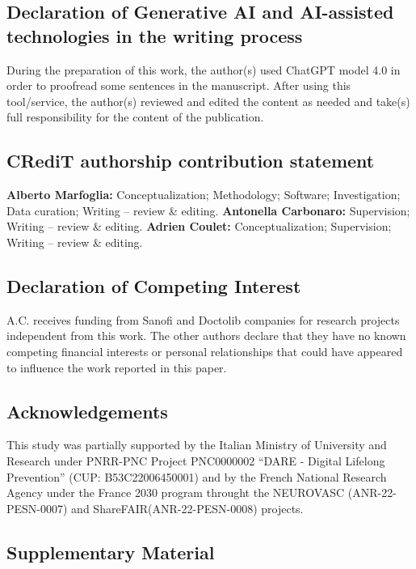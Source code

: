 \subsection*{Declaration of Generative AI and AI-assisted technologies in the writing process}
During the preparation of this work, the author(s) used ChatGPT model 4.0 in order to proofread some sentences in the manuscript. After using this tool/service, the author(s) reviewed and edited the content as needed and take(s) full responsibility for the content of the publication.

\subsection*{CRediT authorship contribution statement}

\textbf{Alberto Marfoglia:} Conceptualization; Methodology; Software; Investigation; Data curation; Writing – review \& editing.
\textbf{Antonella Carbonaro:} Supervision; Writing – review \& editing.
\textbf{Adrien Coulet:} Conceptualization; Supervision; Writing – review \& editing.


\subsection*{Declaration of Competing Interest}
A.C. receives funding from Sanofi and Doctolib companies for research projects independent from this work. The other authors declare that they have no known competing financial interests or personal relationships that could have appeared to influence the work reported in this paper.

\subsection*{Acknowledgements}
This study was partially supported by the Italian Ministry of University and Research under PNRR-PNC Project PNC0000002 “DARE - Digital Lifelong Prevention” (CUP: B53C22006450001) and by the French National Research Agency under the France 2030 program throught the NEUROVASC (ANR-22-PESN-0007) and ShareFAIR(ANR-22-PESN-0008) projects.

\FloatBarrier

\subsection{Supplementary Material}
\label{sec:paper3_supplementary}

